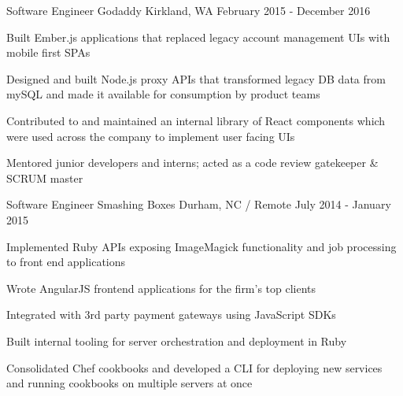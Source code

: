 \begin{cventries}
  \cventry
    {Software Engineer} %
    {Godaddy} %
    {Kirkland, WA} %
    {February 2015 - December 2016} %
    {
      \begin{cvitems} %
        \item {Built Ember.js applications that replaced legacy account management UIs with mobile first SPAs}
        \item {Designed and built Node.js proxy APIs that transformed legacy DB data from mySQL and made it available for consumption by product teams}
        \item {Contributed to and maintained an internal library of React components which were used across the company to implement user facing UIs}
        \item {Mentored junior developers and interns; acted as a code review gatekeeper \& SCRUM master}
      \end{cvitems}
    }

  \cventry
    {Software Engineer} %
    {Smashing Boxes} %
    {Durham, NC / Remote} %
    {July 2014 - January 2015} %
    {
      \begin{cvitems} %
        \item {Implemented Ruby APIs exposing ImageMagick functionality and job processing to front end applications}
        \item {Wrote AngularJS frontend applications for the firm's top clients}
        \item {Integrated with 3rd party payment gateways using JavaScript SDKs}
        \item {Built internal tooling for server orchestration and deployment in Ruby}
        \item {Consolidated Chef cookbooks and developed a CLI for deploying new services and running cookbooks on multiple servers at once}
      \end{cvitems}
    }



\end{cventries}
